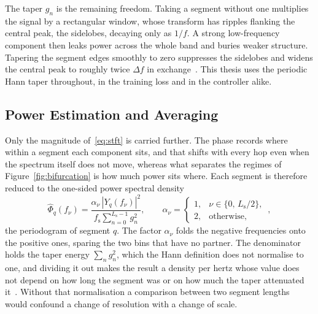 The taper $g_n$ is the remaining freedom. Taking a segment without one multiplies the signal
by a rectangular window, whose transform has ripples flanking the central peak, the sidelobes,
decaying only as $1/f$. A strong low-frequency component then leaks power across the whole
band and buries weaker structure. Tapering the segment edges smoothly to zero suppresses the
sidelobes and widens the central peak to roughly twice $\Delta f$ in exchange~\cite{Oppenheim2010}. This thesis uses the periodic Hann taper throughout, in the training %
loss and in the controller alike.

\subsection{Power Estimation and Averaging}
\label{sec:stft_power}

Only the magnitude of~\eqref{eq:stft} is carried further. The phase records where within a
segment each component sits, and that shifts with every hop even when the spectrum itself does
not move, whereas what separates the regimes of Figure~\ref{fig:bifurcation} is how much power
sits where. Each segment is therefore reduced to the one-sided power spectral density
%
\begin{equation}
    \hat{\Phi}_q(f_\nu) = \frac{\alpha_\nu \, |Y_q(f_\nu)|^2}
    {f_\mathrm{s} \sum_{n=0}^{L_\mathrm{s}-1} g_n^2},
    \qquad
    \alpha_\nu =
    \begin{cases}
        1, & \nu \in \{0, \, L_\mathrm{s}/2\}, \\
        2, & \text{otherwise},
    \end{cases} \,,
    \label{eq:periodogram}
\end{equation}
%
the periodogram of segment $q$. The factor $\alpha_\nu$ folds the negative frequencies onto
the positive ones, sparing the two bins that have no partner. The denominator holds the taper
energy $\sum_n g_n^2$, which the Hann definition does not normalise to one, and dividing it
out makes the result a density per hertz whose value does not depend on how long the segment
was or on how much the taper attenuated it~\cite{Oppenheim2010}. Without that normalisation a %
comparison between two segment lengths would confound a change of resolution with a change of
scale.

